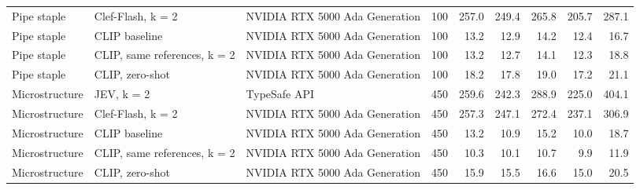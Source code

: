 \begin{table}
\begin{tabular}[t]{lllrrrrrr}
Pipe staple & Clef-Flash, k = 2 & NVIDIA RTX 5000 Ada Generation & 100 & 257.0 & 249.4 & 265.8 & 205.7 & 287.1\\
Pipe staple & CLIP baseline & NVIDIA RTX 5000 Ada Generation & 100 & 13.2 & 12.9 & 14.2 & 12.4 & 16.7\\
Pipe staple & CLIP, same references, k = 2 & NVIDIA RTX 5000 Ada Generation & 100 & 13.2 & 12.7 & 14.1 & 12.3 & 18.8\\
Pipe staple & CLIP, zero-shot & NVIDIA RTX 5000 Ada Generation & 100 & 18.2 & 17.8 & 19.0 & 17.2 & 21.1\\
\addlinespace
Microstructure & JEV, k = 2 & TypeSafe API & 450 & 259.6 & 242.3 & 288.9 & 225.0 & 404.1\\
Microstructure & Clef-Flash, k = 2 & NVIDIA RTX 5000 Ada Generation & 450 & 257.3 & 247.1 & 272.4 & 237.1 & 306.9\\
Microstructure & CLIP baseline & NVIDIA RTX 5000 Ada Generation & 450 & 13.2 & 10.9 & 15.2 & 10.0 & 18.7\\
Microstructure & CLIP, same references, k = 2 & NVIDIA RTX 5000 Ada Generation & 450 & 10.3 & 10.1 & 10.7 & 9.9 & 11.9\\
Microstructure & CLIP, zero-shot & NVIDIA RTX 5000 Ada Generation & 450 & 15.9 & 15.5 & 16.6 & 15.0 & 20.5\\
\bottomrule
\end{tabular}
\end{table}
